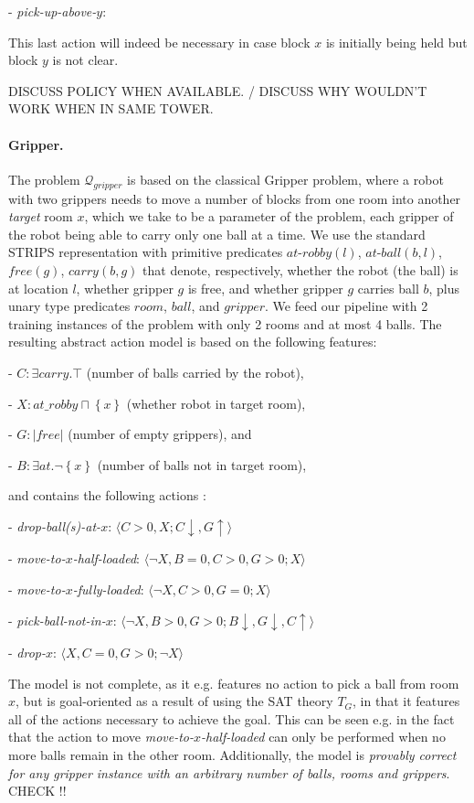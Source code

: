 \documentclass[letterpaper]{article} %
\newcommand{\tuple}[1]{\ensuremath{\langle #1 \rangle}}
\newcommand{\set}[1]{\ensuremath{\left\{#1 \right\}}}
\newcommand{\abs}[1]{\ensuremath{\left\vert{#1}\right\vert}}
\newcommand{\Q}{\mathcal{Q}}
\begin{document}
- \emph{pick-up-above-$y$}: 

This last action will indeed be necessary in case block $x$ is initially being held
but block $y$ is not clear.

DISCUSS POLICY WHEN AVAILABLE. / 
DISCUSS WHY WOULDN'T WORK WHEN IN SAME TOWER.


\paragraph{Gripper.}
The problem $\Q_{gripper}$ is based on the classical Gripper problem, where a robot with two grippers needs to 
move a number of blocks from one room into another \emph{target} room $x$, which we take to be a parameter of the problem,
each gripper of the robot being able to carry only one ball at a time.
We use the standard STRIPS representation with primitive predicates $at\text{-}robby(l)$, $at\text{-}ball(b, l)$, $free(g)$, $carry(b, g)$ that denote,
respectively, whether the robot (the ball) is at location $l$, whether gripper $g$ is free, and whether gripper $g$ carries ball $b$,
plus unary type predicates $room$, $ball$, and $gripper$.
%
We feed our pipeline with 2 training instances of the problem with only 2 rooms and at most 4 balls.
The resulting abstract action model is based on the following features:

- $C: \exists carry . \top$ (number of balls carried by the robot), 

- $X: at\_robby \sqcap \set{x}$ (whether robot in target room),

- $G: \abs{free}$ (number of empty grippers), and

- $B: \exists at . \neg \set{x}$ (number of balls not in target room),


\noindent and contains the following actions :

- \emph{drop-ball(s)-at-$x$}: \tuple{C>0, X;  C\downarrow, G \uparrow}

- \emph{move-to-$x$-half-loaded}: \tuple{\neg X, B=0, C>0, G>0;   X}

- \emph{move-to-$x$-fully-loaded}: \tuple{\neg X, C>0, G=0;   X}

- \emph{pick-ball-not-in-$x$}: \tuple{\neg X, B > 0, G > 0;   B \downarrow, G \downarrow, C\uparrow}

- \emph{drop-$x$}: \tuple{X, C=0, G > 0;   \neg X}


The model is not complete, as it e.g. features no action to pick a ball from room $x$,
but is goal-oriented as a result of using the SAT theory $T_G$, in that it features all of the actions
necessary to achieve the goal.
This can be seen e.g. in the fact that the action to move \emph{move-to-$x$-half-loaded}
can only be performed when no more balls remain in the other room.
Additionally, the model is \emph{provably correct for any gripper instance with an arbitrary number of balls, 
rooms and grippers}. CHECK !!
\end{document}
